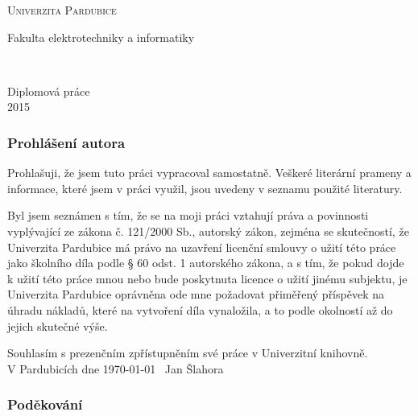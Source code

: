\documentclass[11pt,a4paper,fleqn,titlepage,twoside,openany]{book}
\begin{document}
\makeatletter
\begin{titlepage}
	\begin{center}
	
	\textsc{\Huge{Univerzita Pardubice}}

	\LARGE{Fakulta elektrotechniky a informatiky}
	
	\vfill
	
	\huge{\@title}\\[2mm]
	\LARGE{\@author}
	
	\vfill

	\begin{normalsize}
	Diplomová práce\\
	2015
	\end{normalsize}
	\end{center}
\end{titlepage}

\newpage  
\thispagestyle{empty}
\hspace{0pt}

\newpage 
\thispagestyle{empty}
\hspace{0pt}

\onehalfspacing

\newpage 
\thispagestyle{empty}
\subsubsection*{Prohlášení autora}

Prohlašuji, že jsem tuto práci vypracoval samostatně. Veškeré literární prameny a informace, které jsem v práci využil, jsou uvedeny v seznamu použité literatury.

Byl jsem seznámen s tím, že se na moji práci vztahují práva a povinnosti vyplývající ze zákona č. 121/2000 Sb., autorský zákon, zejména se skutečností, že Univerzita Pardubice má právo na uzavření licenční smlouvy o užití této práce jako školního díla podle § 60 odst. 1 autorského zákona, a s tím, že pokud dojde k užití této práce mnou nebo bude poskytnuta licence o užití jinému subjektu, je Univerzita Pardubice oprávněna ode mne požadovat přiměřený příspěvek na úhradu nákladů, které na vytvoření díla vynaložila, a to podle okolností až do jejich skutečné výše.

Souhlasím s prezenčním zpřístupněním své práce v Univerzitní knihovně.\\[4cm]
V Pardubicích dne \today\ \hfill{} Jan Šlahora

\newpage 
\thispagestyle{empty}
\subsubsection*{Poděkování}
\end{document}
